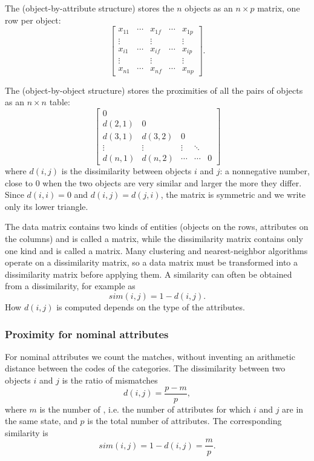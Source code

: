 The  (object-by-attribute structure) stores the $n$ objects as an $n\times p$ matrix, one row per object:
\[
    \begin{bmatrix}
        x_{11} & \cdots & x_{1f} & \cdots & x_{1p}\\
        \vdots &        & \vdots &        & \vdots\\
        x_{i1} & \cdots & x_{if} & \cdots & x_{ip}\\
        \vdots &        & \vdots &        & \vdots\\
        x_{n1} & \cdots & x_{nf} & \cdots & x_{np}
    \end{bmatrix}.
\]

The  (object-by-object structure) stores the proximities of all the pairs of objects as an $n\times n$ table:
\[
    \begin{bmatrix}
        0      &        &        &   \\
        d(2,1) & 0      &        &   \\
        d(3,1) & d(3,2) & 0      &   \\
        \vdots & \vdots & \vdots & \ddots \\
        d(n,1) & d(n,2) & \cdots & \cdots & 0
    \end{bmatrix}
\]
where $d(i,j)$ is the dissimilarity between objects $i$ and $j$: a nonnegative number, close to $0$ when the two objects are very similar and larger the more they differ. Since $d(i,i)=0$ and $d(i,j)=d(j,i)$, the matrix is symmetric and we write only its lower triangle.

The data matrix contains two kinds of entities (objects on the rows, attributes on the columns) and is called a  matrix, while the dissimilarity matrix contains only one kind and is called a  matrix. Many clustering and nearest-neighbor algorithms operate on a dissimilarity matrix, so a data matrix must be transformed into a dissimilarity matrix before applying them. A similarity can often be obtained from a dissimilarity, for example as
\[
    sim(i,j)=1-d(i,j).
\]
How $d(i,j)$ is computed depends on the type of the attributes.

\subsubsection{Proximity for nominal attributes}
For nominal attributes we count the matches, without inventing an arithmetic distance between the codes of the categories. The dissimilarity between two objects $i$ and $j$ is the ratio of mismatches
\[
    d(i,j)=\frac{p-m}{p},
\]
where $m$ is the number of , i.e. the number of attributes for which $i$ and $j$ are in the same state, and $p$ is the total number of attributes. The corresponding similarity is
\[
    sim(i,j)=1-d(i,j)=\frac{m}{p}.
\]


